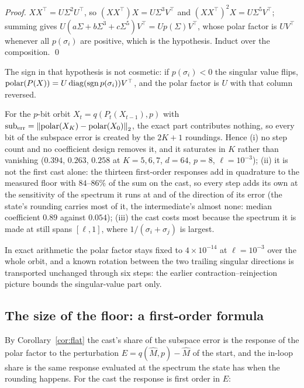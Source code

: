 \begin{proof}
$XX^\top = U\Sigma^2U^\top$, so $(XX^\top)X = U\Sigma^3V^\top$ and
$(XX^\top)^2X = U\Sigma^5V^\top$; summing gives
$U(a\Sigma+b\Sigma^3+c\Sigma^5)V^\top = Up(\Sigma)V^\top$, whose polar factor is
$UV^\top$ whenever all $p(\sigma_i)$ are positive, which is the hypothesis.  Induct over
the composition.  \qed
\end{proof}

The sign in that hypothesis is not cosmetic: if $p(\sigma_i)<0$ the singular value flips,
$\operatorname{polar}(P(X)) = U\operatorname{diag}(\operatorname{sgn}p(\sigma_i))V^\top$, and the polar
factor is $U$ with that column reversed.

\begin{corollary}
\label{cor:flat}
For the $p$-bit orbit $X_t = q(P_t(X_{t-1}),p)$ with
$\mathrm{sub}_{\mathrm{err}} = \left\lVert \operatorname{polar}(X_K) - \operatorname{polar}(X_0) \right\rVert_2$, the exact part
contributes nothing, so every bit of the subspace error is created by the $2K+1$
roundings.  Hence (i) no step count and no coefficient design removes it, and it saturates
in $K$ rather than vanishing ($0.394$, $0.263$, $0.258$ at $K=5,6,7$, $d=64$, $p=8$,
$\ell=10^{-3}$); (ii) it is not the first cast alone: the thirteen first-order responses add
in quadrature to the measured floor with $84$--$86\%$ of the sum on the cast, so every step
adds its own at the sensitivity of the spectrum it runs at and of the direction of its
error (the state's rounding carries most of it, the intermediate's almost none: median
coefficient $0.89$ against $0.054$); (iii) the cast costs most
because the spectrum it is made at still spans $[\ell,1]$, where $1/(\sigma_i+\sigma_j)$ is
largest.
\end{corollary}

In exact arithmetic the polar factor stays fixed to $4\times10^{-14}$ at $\ell=10^{-3}$
over the whole orbit, and a known rotation between the two trailing singular directions is
transported unchanged through six steps: the earlier contraction--reinjection picture
bounds the singular-value part only.

\subsection{The size of the floor: a first-order formula}
\label{sec:firstorder}

By Corollary~\ref{cor:flat} the cast's share of the subspace error is the response of the
polar factor to the perturbation $E = q(\hat M,p) - \hat M$ of the start, and the in-loop
share is the same response evaluated at the spectrum the state has when the rounding
happens.  For the cast the response is first order in $E$:

